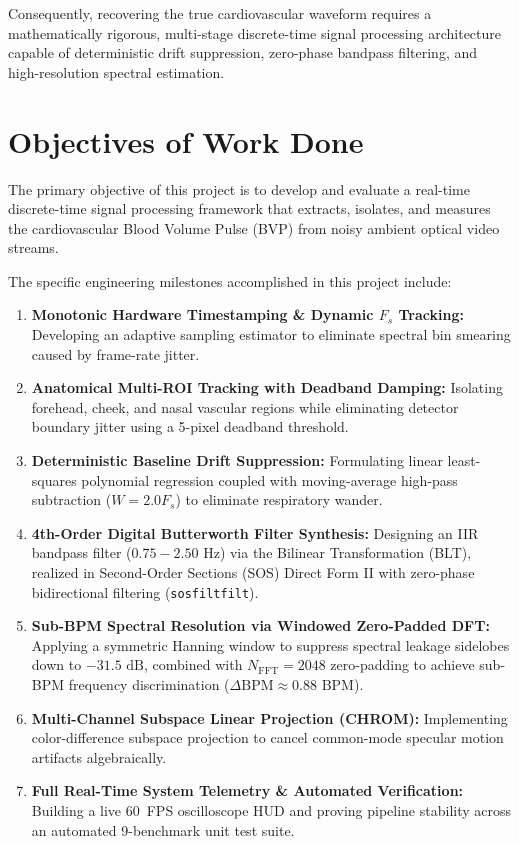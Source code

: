 \documentclass[11pt,a4paper]{report}
\begin{document}
Consequently, recovering the true cardiovascular waveform requires a mathematically rigorous, multi-stage discrete-time signal processing architecture capable of deterministic drift suppression, zero-phase bandpass filtering, and high-resolution spectral estimation.

\section{Objectives of Work Done}
The primary objective of this project is to develop and evaluate a real-time discrete-time signal processing framework that extracts, isolates, and measures the cardiovascular Blood Volume Pulse (BVP) from noisy ambient optical video streams. 

The specific engineering milestones accomplished in this project include:
\begin{enumerate}
    \item \textbf{Monotonic Hardware Timestamping \& Dynamic $F_s$ Tracking:} Developing an adaptive sampling estimator to eliminate spectral bin smearing caused by frame-rate jitter.
    \item \textbf{Anatomical Multi-ROI Tracking with Deadband Damping:} Isolating forehead, cheek, and nasal vascular regions while eliminating detector boundary jitter using a 5-pixel deadband threshold.
    \item \textbf{Deterministic Baseline Drift Suppression:} Formulating linear least-squares polynomial regression coupled with moving-average high-pass subtraction ($W = 2.0 F_s$) to eliminate respiratory wander.
    \item \textbf{4th-Order Digital Butterworth Filter Synthesis:} Designing an IIR bandpass filter ($0.75 - 2.50\text{ Hz}$) via the Bilinear Transformation (BLT), realized in Second-Order Sections (SOS) Direct Form II with zero-phase bidirectional filtering (\texttt{sosfiltfilt}).
    \item \textbf{Sub-BPM Spectral Resolution via Windowed Zero-Padded DFT:} Applying a symmetric Hanning window to suppress spectral leakage sidelobes down to $-31.5\text{ dB}$, combined with $N_{\text{FFT}} = 2048$ zero-padding to achieve sub-BPM frequency discrimination ($\Delta\text{BPM} \approx 0.88\text{ BPM}$).
    \item \textbf{Multi-Channel Subspace Linear Projection (CHROM):} Implementing color-difference subspace projection to cancel common-mode specular motion artifacts algebraically.
    \item \textbf{Full Real-Time System Telemetry \& Automated Verification:} Building a live 60~FPS oscilloscope HUD and proving pipeline stability across an automated 9-benchmark unit test suite.
\end{enumerate}
\end{document}
